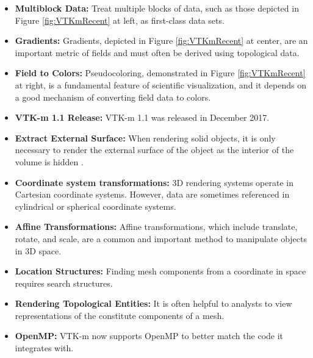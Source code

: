 \begin{itemize}
\item \textbf{Multiblock Data:}
  Treat multiple blocks of data, such as those depicted in Figure \ref{fig:VTKmRecent} at left, as first-class data sets.
\item \textbf{Gradients:}
  Gradients, depicted in Figure \ref{fig:VTKmRecent} at center, are an important metric of fields and must often be derived using topological data.
\item \textbf{Field to Colors:}
  Pseudocoloring, demonstrated in Figure \ref{fig:VTKmRecent} at right, is a fundamental feature of scientific visualization, and it depends on a good mechanism of converting field data to colors.
\item \textbf{VTK-m 1.1 Release:}
  VTK-m 1.1 was released in December 2017.
\item \textbf{Extract External Surface:}
  When rendering solid objects, it is only necessary to render the external surface of the object as the interior of the volume is hidden \cite{Lessley2016,Lessley2017}.
\item \textbf{Coordinate system transformations:}
  3D rendering systems operate in Cartesian coordinate systems.
  However, data are sometimes referenced in cylindrical or spherical coordinate systems.%
\item \textbf{Affine Transformations:}
  Affine transformations, which include translate, rotate, and scale, are a common and important method to manipulate objects in 3D space.
\item \textbf{Location Structures:}
  Finding mesh components from a coordinate in space requires search structures.
\item \textbf{Rendering Topological Entities:}
  It is often helpful to analysts to view representations of the constitute components of a mesh.
\item \textbf{OpenMP:}
  VTK-m now supports OpenMP \cite{OpenMP} to better match the code it integrates with.
\end{itemize}

